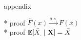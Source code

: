 appendix

* proof $\hat{F}(x) \stackrel{a.s.}{\to} F(x)$ \\
* proof $\mathbb{E}[\bar{X}_. \mid \mathbf{X}] = \bar{X}$

